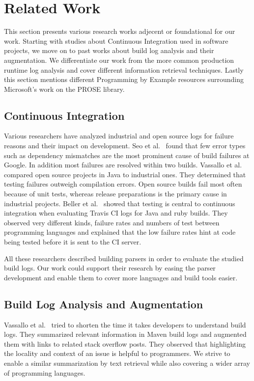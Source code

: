 \documentclass[\myrootdir/main.tex]{subfiles}
\begin{document}
\chapter{Related Work}
\label{sec:rw}
This section presents various research works adjecent or foundational for our work. Starting with studies about Continuous Integration used in software projects, we move on to past works about build log analysis and their augmentation. We differentiate our work from the more common production runtime log analysis and cover different information retrieval techniques. Lastly this section mentions different Programming by Example resources surrounding Microsoft's work on the PROSE library.

\section{Continuous Integration}
Various researchers have analyzed industrial and open source logs for failure reasons and their impact on development. Seo et al.~\cite{seo2014programmers} found that few error types such as dependency mismatches are the most prominent cause of build failures at Google. In addition most failures are resolved within two builds. Vassallo et al.~\cite{vassallo2017a-tale} compared open source projects in Java to industrial ones. They determined that testing failures outweigh compilation errors. Open source builds fail most often because of unit tests, whereas release preparations is the primary cause in industrial projects. Beller et al.~\cite{beller2017oops} showed that testing is central to continuous integration when evaluating Travis CI logs for Java and ruby builds. They observed very different kinds, failure rates and numbers of test between programming languages and explained that the low failure rates hint at code being tested before it is sent to the CI server.

All these researchers described building parsers in order to evaluate the studied build logs. Our work could support their research by easing the parser development and enable them to cover more languages and build tools easier.

\section{Build Log Analysis and Augmentation}
\label{sec:rw-bl-analysis}
Vassallo et al.~\cite{vassallo2018un-break} tried to shorten the time it takes developers to understand build logs. They summarized relevant information in Maven build logs and augmented them with links to related stack overflow posts. They observed that highlighting the locality and context of an issue is helpful to programmers. We strive to enable a similar summarization by text retrieval while also covering a wider array of programming languages.
\end{document}
